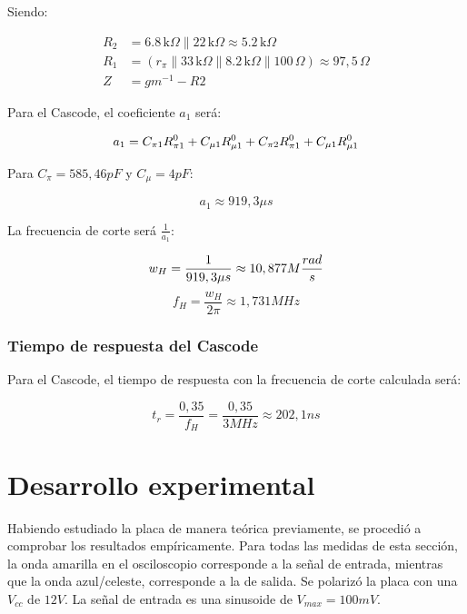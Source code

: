 \documentclass[letterpaper, 10 pt, conference]{ieeeconf}  %
\begin{document}
Siendo:

\begin{equation}
\begin{aligned}
R_2 &= 6.8\,\text{k}\Omega \parallel 22\,\text{k}\Omega \approx 5.2\,\text{k}\Omega \\
R_1 &= (r_{\pi} \parallel 33\,\text{k}\Omega \parallel 8.2\,\text{k}\Omega \parallel 100\,\Omega) \approx 97,5\,\Omega \\
Z &= gm^{-1} - R2 
\end{aligned}
\end{equation}

Para el Cascode, el coeficiente $a_1$ será:

\begin{equation}
    a_1 = C_{\pi1} R_{\pi1}^0 + C_{\mu1}  R_{\mu1}^0 +  C_{\pi2} R_{\pi1}^0 + C_{\mu1}  R_{\mu1}^0 \\
\end{equation}

Para $ C_\pi = 585,46pF$ y $C_\mu = 4pF$:

\begin{equation}
    a_1 \approx 919,3\mu s
\end{equation}

La frecuencia de corte será $\frac{1}{a_1}$:

\begin{equation}
    w_H = \frac{1}{919,3\mu s} \approx 10,877M \frac{rad}{s}\\
\end{equation}
\begin{equation}
    f_H = \frac{w_H}{2\pi} \approx 1,731MHz
\end{equation}

\subsubsection{Tiempo de respuesta del Cascode}
Para el Cascode, el tiempo de respuesta con la frecuencia de corte calculada será:

\begin{equation}
    t_r = \frac{0,35}{f_H} = \frac{0,35}{3MHz} \approx 202,1ns
\end{equation}

\section{Desarrollo experimental}
Habiendo estudiado la placa de manera teórica previamente, se procedió a comprobar los resultados empíricamente.
Para todas las medidas de esta sección, la onda amarilla en el osciloscopio corresponde a la señal de entrada, mientras que la onda azul/celeste, corresponde a la de salida. Se polarizó la placa con una $V_{cc}$ de $12V$.
La señal de entrada es una sinusoide de $V_{max} = 100mV$.
\end{document}
